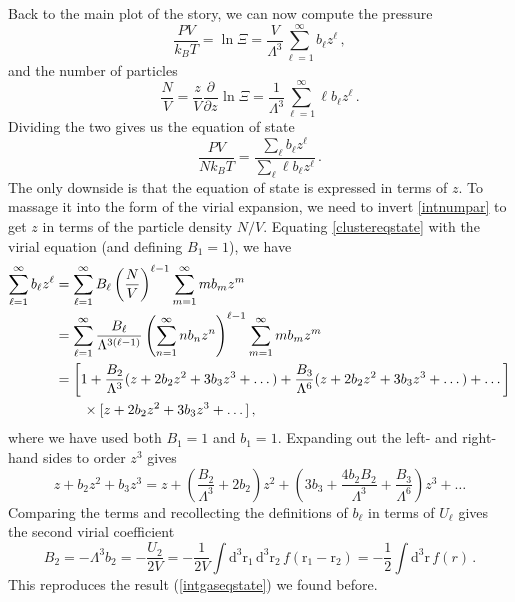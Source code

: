 \documentclass{article}
\theoremstyle{plain}\theoremheaderfont{\normalfont\bfseries}\theorembodyfont{\rmfamily}\theoremseparator{.}\newtheorem*{thm}{Theorem}\newtheorem*{law}{Law}\newtheorem*{pos}{Postulate}
\numberwithin{equation}{section}
\newcommand{\dd}[2][]{\mathrm{d}^{#1} #2\,}
\newcommand{\pdv}[3][]{\frac{\partial^{#1} #2}{{\partial #3}^{#1}}}
\newcommand{\vb}[1]{\bm{\mathrm{#1}}}
\begin{document}
    Back to the main plot of the story, we can now compute the pressure
    \begin{equation}
        \frac{PV}{k_BT}=\ln\Xi=\frac{V}{\Lambda^3}\sum_{\ell=1}^{\infty}b_\ell z^\ell\,,
    \end{equation}
    and the number of particles
    \begin{equation}\label{intnumpar}
        \frac{N}{V}=\frac{z}{V}\pdv{}{z}\ln\Xi=\frac{1}{\Lambda^3}\sum_{\ell=1}^{\infty}\ell b_\ell z^\ell\,.
    \end{equation}
    Dividing the two gives us the equation of state
    \begin{equation}\label{clustereqstate}
        \frac{PV}{Nk_BT}=\frac{\sum_\ell b_\ell z^\ell}{\sum_\ell \ell b_\ell z^\ell}\,.
    \end{equation}
    The only downside is that the equation of state is expressed in terms of \(z\). To massage it into the form of the virial expansion, we need to invert \cref{intnumpar} to get \(z\) in terms of the particle density \(N/V\). Equating \cref{clustereqstate} with the virial equation (and defining \(B_1=1\)), we have
    \begin{align}
        \sum_{\ell=1}^{\infty}b_\ell z^\ell&=\sum_{\ell=1}^{\infty}B_\ell \left(\frac{N}{V}\right)^{\ell-1}\sum_{m=1}^{\infty}m b_m z^m\notag\\
        &=\sum_{\ell=1}^{\infty}\frac{B_\ell}{\Lambda^{3(\ell-1)}}\left(\sum_{n=1}^{\infty}n b_n z^n\right)^{\ell-1}\sum_{m=1}^{\infty}m b_m z^m\notag\\
        &=\left[1+\frac{B_2}{\Lambda^3}(z+2b_2z^2+3b_3z^3+\dots)+\frac{B_3}{\Lambda^6}(z+2b_2z^2+3b_3z^3+\dots)+\dots\right]\notag\\
        &\qquad\times [z+2b_2z^2+3b_3z^3+\dots]\,,
    \end{align}
    where we have used both \(B_1=1\) and \(b_1=1\). Expanding out the left- and right-hand sides to order \(z^3\) gives
    \begin{equation}
        z+b_2z^2+b_3z^3=z+\left(\frac{B_2}{\Lambda^3}+2b_2\right)z^2+\left(3b_3+\frac{4b_2B_2}{\Lambda^3}+\frac{B_3}{\Lambda^6}\right)z^3+\dots
    \end{equation}
    Comparing the terms and recollecting the definitions of \(b_\ell\) in terms of \(U_\ell\) gives the second virial coefficient
    \begin{equation}
        B_2=-\Lambda^3b_2=-\frac{U_2}{2V}=-\frac{1}{2V}\int\dd[3]{\vb{r}_1}\dd[3]{\vb{r}_2}f(\vb{r}_1-\vb{r}_2)=-\frac{1}{2}\int\dd[3]{\vb{r}}f(r)\,.
    \end{equation}
    This reproduces the result (\ref{intgaseqstate}) we found before.
\end{document}
